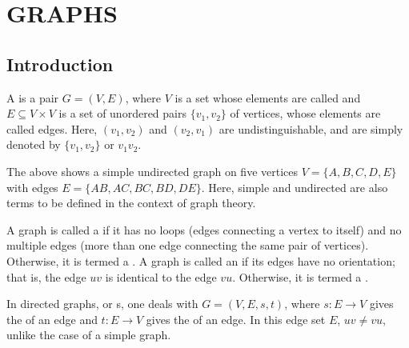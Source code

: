 \chapter{GRAPHS}


\section{Introduction}
A  is a pair $G = (V,E)$, where $V$ is a set whose elements are called  and $E \subseteq V \times V$ is a set of unordered pairs $\{v_{1},v_{2}\}$ of vertices, whose elements are called edges. Here, $(v_{1},v_{2})$ and $(v_{2},v_{1})$ are undistinguishable, and are simply denoted by $\{v_{1},v_{2}\}$ or $v_{1}v_{2}$.
\begin{figure}[h]
    \centering
\end{figure}

The above shows a simple undirected graph on five vertices $V=\{A,B,C,D,E\}$ with edges $E=\{AB,AC,BC,BD,DE\}$. Here, simple and undirected are also terms to be defined in the context of graph theory.

\begin{definition}
    A graph is called a  if it has no loops (edges connecting a vertex to itself) and no multiple edges (more than one edge connecting the same pair of vertices). Otherwise, it is termed a . A graph is called an  if its edges have no orientation; that is, the edge $uv$ is identical to the edge $vu$. Otherwise, it is termed a .
\end{definition}

In directed graphs, or s, one deals with $G = (V,E,s,t)$, where $s:E \to V$ gives the  of an edge and $t:E \to V$ gives the  of an edge. In this edge set $E$, $uv \neq vu$, unlike the case of a simple graph.

